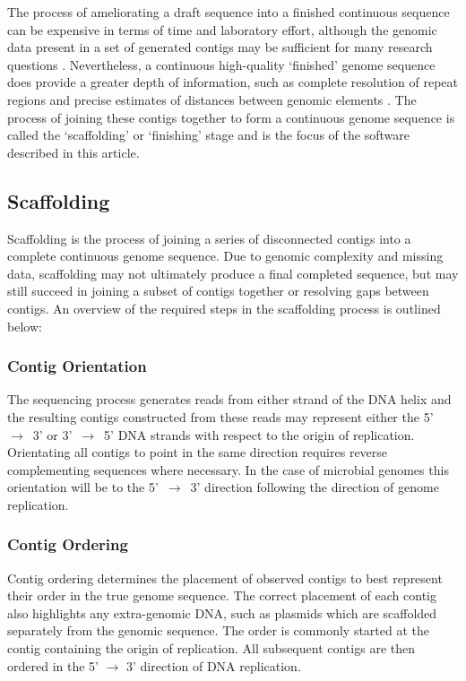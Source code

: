 \documentclass[10pt]{bmc_article}
\newenvironment{bmcformat}{\begin{raggedright}\baselineskip20pt\sloppy\setboolean{publ}{false}}{\end{raggedright}\baselineskip20pt\sloppy}
\begin{document}
\begin{bmcformat}
The process of ameliorating a draft sequence into a finished continuous
sequence can be expensive in terms of time and laboratory effort, although the
genomic data present in a set of generated contigs may be sufficient for many
research questions \cite{branscomb2002}. Nevertheless, a continuous
high-quality `finished' genome sequence does provide a greater depth of
information, such as complete resolution of repeat regions and precise
estimates of distances between genomic elements \cite{parkhill2002,fraser2002}.
The process of joining these contigs together to form a continuous genome
sequence is called the `scaffolding' or `finishing' stage and is the focus of
the software described in this article. \pb

\subsection*{Scaffolding} %

Scaffolding is the process of joining a series of disconnected contigs into
a complete continuous genome sequence. Due to genomic complexity and missing
data, scaffolding may not ultimately produce a final completed sequence, but
may still succeed in joining a subset of contigs together or resolving gaps
between contigs. An overview of the required steps in the scaffolding process
is outlined below:

\subsubsection*{Contig Orientation} %

The sequencing process generates reads from either strand of the DNA helix and
the resulting contigs constructed from these reads may represent either the
5'~$\rightarrow$~3' or 3'~$\rightarrow$~5' DNA strands with respect to the
origin of replication. Orientating all contigs to point in the same direction
requires reverse complementing sequences where necessary. In the case of
microbial genomes this orientation will be to the 5'~$\rightarrow$~3'
direction following the direction of genome replication.

\subsubsection*{Contig Ordering} %

Contig ordering determines the placement of observed contigs to best represent
their order in the true genome sequence. The correct placement of each contig
also highlights any extra-genomic DNA, such as plasmids which are scaffolded
separately from the genomic sequence. The order is commonly started at the
contig containing the origin of replication. All subsequent contigs are then
ordered in the 5' $\rightarrow$ 3' direction of DNA replication.


\end{bmcformat}
\end{document}
